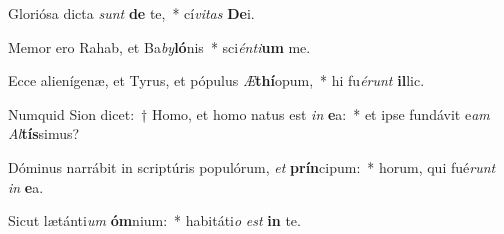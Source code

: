 \item Gloriósa dicta \textit{sunt} \textbf{de} te,~* cí\textit{vi}\textit{tas} \textbf{De}i.
\item Memor ero Rahab, et Ba\textit{by}\textbf{ló}nis~* sci\textit{én}\textit{ti}\textbf{um} me.
\item Ecce alienígenæ, et Tyrus, et pópulus \textit{Æ}\textbf{thí}opum,~* hi fu\textit{é}\textit{runt} \textbf{il}lic.
\item Numquid Sion dicet:~† Homo, et homo natus est \textit{in} \textbf{e}a:~* et ipse fundávit e\textit{am} \textit{Al}\textbf{tís}simus?
\item Dóminus narrábit in scriptúris populórum, \textit{et} \textbf{prín}cipum:~* horum, qui fué\textit{runt} \textit{in} \textbf{e}a.
\item Sicut lætánti\textit{um} \textbf{óm}nium:~* habitáti\textit{o} \textit{est} \textbf{in} te.
